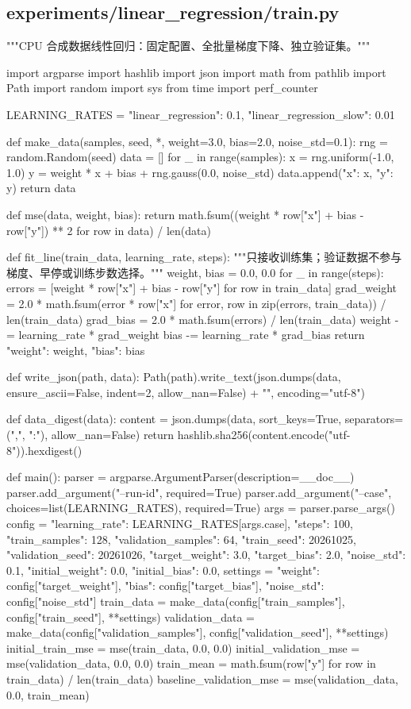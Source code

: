 \documentclass[UTF8,zihao=-4,fontset=fandol]{ctexart}
\begin{document}
\subsection{experiments/linear\_regression/train.py}

\begin{Code}
"""CPU 合成数据线性回归：固定配置、全批量梯度下降、独立验证集。"""

import argparse
import hashlib
import json
import math
from pathlib import Path
import random
import sys
from time import perf_counter


LEARNING_RATES = {"linear_regression": 0.1, "linear_regression_slow": 0.01}


def make_data(samples, seed, *, weight=3.0, bias=2.0, noise_std=0.1):
    rng = random.Random(seed)
    data = []
    for _ in range(samples):
        x = rng.uniform(-1.0, 1.0)
        y = weight * x + bias + rng.gauss(0.0, noise_std)
        data.append({"x": x, "y": y})
    return data


def mse(data, weight, bias):
    return math.fsum((weight * row["x"] + bias - row["y"]) ** 2 for row in data) / len(data)


def fit_line(train_data, learning_rate, steps):
    """只接收训练集；验证数据不参与梯度、早停或训练步数选择。"""
    weight, bias = 0.0, 0.0
    for _ in range(steps):
        errors = [weight * row["x"] + bias - row["y"] for row in train_data]
        grad_weight = 2.0 * math.fsum(error * row["x"] for error, row in zip(errors, train_data)) / len(train_data)
        grad_bias = 2.0 * math.fsum(errors) / len(train_data)
        weight -= learning_rate * grad_weight
        bias -= learning_rate * grad_bias
    return {"weight": weight, "bias": bias}


def write_json(path, data):
    Path(path).write_text(json.dumps(data, ensure_ascii=False, indent=2, allow_nan=False) + "\n", encoding="utf-8")


def data_digest(data):
    content = json.dumps(data, sort_keys=True, separators=(",", ":"), allow_nan=False)
    return hashlib.sha256(content.encode("utf-8")).hexdigest()


def main():
    parser = argparse.ArgumentParser(description=__doc__)
    parser.add_argument("--run-id", required=True)
    parser.add_argument("--case", choices=list(LEARNING_RATES), required=True)
    args = parser.parse_args()
    config = {
        "learning_rate": LEARNING_RATES[args.case], "steps": 100,
        "train_samples": 128, "validation_samples": 64,
        "train_seed": 20261025, "validation_seed": 20261026,
        "target_weight": 3.0, "target_bias": 2.0, "noise_std": 0.1,
        "initial_weight": 0.0, "initial_bias": 0.0,
    }
    settings = {"weight": config["target_weight"], "bias": config["target_bias"], "noise_std": config["noise_std"]}
    train_data = make_data(config["train_samples"], config["train_seed"], **settings)
    validation_data = make_data(config["validation_samples"], config["validation_seed"], **settings)
    initial_train_mse = mse(train_data, 0.0, 0.0)
    initial_validation_mse = mse(validation_data, 0.0, 0.0)
    train_mean = math.fsum(row["y"] for row in train_data) / len(train_data)
    baseline_validation_mse = mse(validation_data, 0.0, train_mean)


\end{Code}
\end{document}

